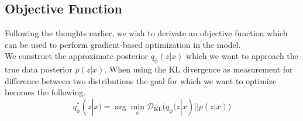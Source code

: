 


\subsection{Objective Function}
Following the thoughts earlier, we wish to derivate an objective function which can be used to perform gradient-based optimization in the model.\\
We construct the approximate posterior $q_\phi(z|x)$ which we want to approach the true data posterior $p(z|x)$.
When using the KL divergence as measurement for difference between two distributions the goal for which we want to optimize becomes the following.
\begin{equation}
  \label{eq:vae_obj}
  q_\phi^{*}(z|x) = \arg\min_{\phi} \mathcal{D}_{\mathrm{KL}} \big(q_\phi(z|x) || p(z|x)\big)
\end{equation}

